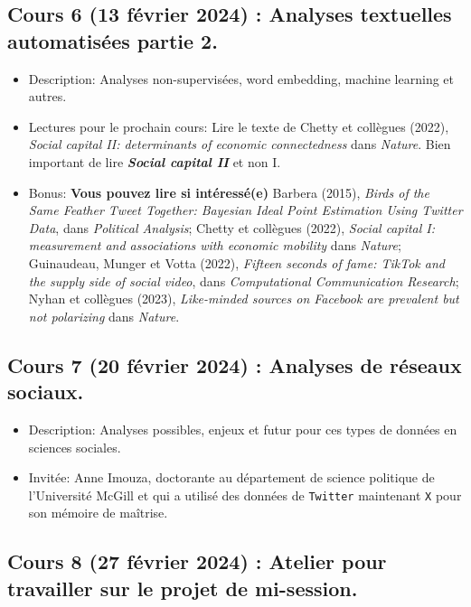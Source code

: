 \documentclass[
  letterpaper,
  DIV=11,
  numbers=noendperiod]{scrartcl}
\begin{document}
\subsection{Cours 6 (13 février 2024) : Analyses textuelles automatisées
partie
2.}\label{cours-6-13-fuxe9vrier-2024-analyses-textuelles-automatisuxe9es-partie-2.}

\begin{itemize}
\item
  Description: Analyses non-supervisées, word embedding, machine
  learning et autres.
\item
  Lectures pour le prochain cours: Lire le texte de Chetty et collègues
  (2022), \emph{Social capital II: determinants of economic
  connectedness} dans \emph{Nature}. Bien important de lire
  \textbf{\emph{Social capital II}} et non I.
\item
  Bonus: \textbf{Vous pouvez lire si intéressé(e)} Barbera (2015),
  \emph{Birds of the Same Feather Tweet Together: Bayesian Ideal Point
  Estimation Using Twitter Data}, dans \emph{Political Analysis}; Chetty
  et collègues (2022), \emph{Social capital I: measurement and
  associations with economic mobility} dans \emph{Nature}; Guinaudeau,
  Munger et Votta (2022), \emph{Fifteen seconds of fame: TikTok and the
  supply side of social video}, dans \emph{Computational Communication
  Research}; Nyhan et collègues (2023), \emph{Like-minded sources on
  Facebook are prevalent but not polarizing} dans \emph{Nature}.
\end{itemize}

\newpage

\subsection{Cours 7 (20 février 2024) : Analyses de réseaux
sociaux.}\label{cours-7-20-fuxe9vrier-2024-analyses-de-ruxe9seaux-sociaux.}

\begin{itemize}
\item
  Description: Analyses possibles, enjeux et futur pour ces types de
  données en sciences sociales.
\item
  Invitée: Anne Imouza, doctorante au département de science politique
  de l'Université McGill et qui a utilisé des données de
  \texttt{Twitter} maintenant \texttt{X} pour son mémoire de maîtrise.
\end{itemize}

\subsection{Cours 8 (27 février 2024) : Atelier pour travailler sur le
projet de
mi-session.}\label{cours-8-27-fuxe9vrier-2024-atelier-pour-travailler-sur-le-projet-de-mi-session.}
\end{document}
